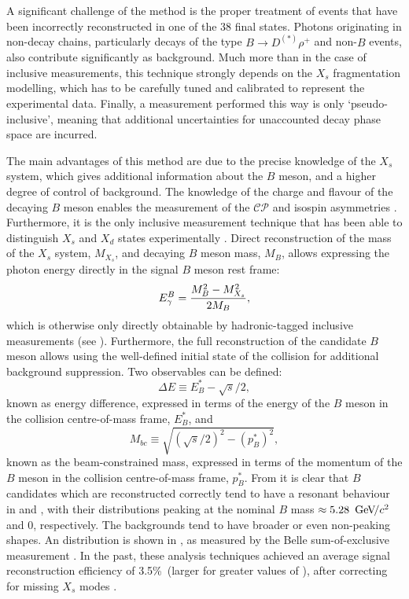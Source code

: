 A significant challenge of the method is the proper treatment of \BtoXsgamma events that have been incorrectly reconstructed in one of the 38 final states.
Photons originating in non-\BtoXsgamma decay chains, particularly decays of the type $B\to D^{(*)}\rho^+$ and non-$B$ events, also contribute significantly as background.
Much more than in the case of inclusive measurements, this technique strongly depends on the $X_s$ fragmentation modelling, which has to be carefully tuned and calibrated to represent the experimental data.
Finally, a measurement performed this way is only `pseudo-inclusive', meaning that additional uncertainties for unaccounted decay phase space are incurred.


The main advantages of this method are due to the precise knowledge of the $X_s$ system, which gives additional information about the $B$ meson, and a higher degree of control of background.
The knowledge of the charge and flavour of the decaying $B$ meson enables the measurement of the $\mathcal{CP}$ and isospin asymmetries \cite{BaBar:2014czi}.
Furthermore, it is the only inclusive measurement technique that has been able to distinguish $X_s$ and $X_d$ states experimentally \cite{BaBar:2010vgu}.
Direct reconstruction of the mass of the $X_s$ system, $M_{X_s}$, and decaying $B$ meson mass, $M_B$, allows expressing the photon energy directly in the signal $B$ meson rest frame:
\begin{equation}\label{eq:mx_egamma_relation}
    {\ensuremath{E^B_{\gamma}}} = \frac{M_B^2 - M_{X_s}^2}{2M_B},
\end{equation}
which is otherwise only directly obtainable by hadronic-tagged inclusive measurements (see ).
Furthermore, the full reconstruction of the candidate $B$ meson allows using the well-defined initial state of the \epem collision for additional background suppression.
Two observables can be defined:
\begin{equation}\label{eq:deltae_inclusive}
    \Delta E \equiv E^*_B - \sqrt{s}/2,
\end{equation}
known as energy difference, expressed in terms of the energy of the $B$ meson in the collision centre-of-mass frame, $E^*_B$, and
\begin{equation}\label{eq:mbc_exclusive}
    M_{bc} \equiv \sqrt{(\sqrt{s}/2)^2 - (p^*_B)^2},
\end{equation}
known as the beam-constrained mass, expressed in terms of the momentum of the $B$ meson in the collision centre-of-mass frame, $p^*_B$.
From  it is clear that $B$ candidates which are reconstructed correctly tend to have a resonant behaviour in \Mbc and \DeltaE, with their distributions peaking at the nominal $B$ mass $\approx5.28~{\mathrm{\,Ge\kern -0.1em V\!/}c^2}$ and $0$, respectively.
The backgrounds tend to have broader or even non-peaking shapes. 
An \Mbc distribution is shown in , as measured by the Belle sum-of-exclusive measurement \cite{Belle:2014nmp}.
In the past, these analysis techniques achieved an average signal reconstruction efficiency of 3.5\%~(larger for greater values of \EB), after correcting for missing $X_s$ modes \cite{Belle:2014nmp}.

